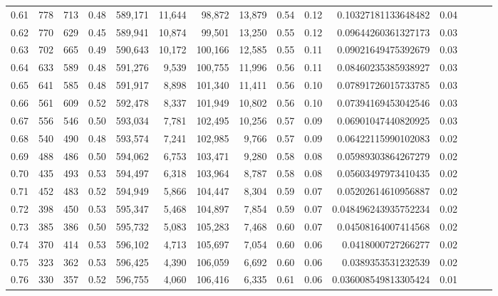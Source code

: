 \begin{tabular}{rrrrrrrrrrrrrrr}
0.61 &     778 &    713 &  0.48 &  589,171 &   11,644 &   98,872 &   13,879 &  0.54 &  0.12 &    0.10327181133648482 &      0.04 \\
0.62 &     770 &    629 &  0.45 &  589,941 &   10,874 &   99,501 &   13,250 &  0.55 &  0.12 &    0.09644260361327173 &      0.03 \\
0.63 &     702 &    665 &  0.49 &  590,643 &   10,172 &  100,166 &   12,585 &  0.55 &  0.11 &    0.09021649475392679 &      0.03 \\
0.64 &     633 &    589 &  0.48 &  591,276 &    9,539 &  100,755 &   11,996 &  0.56 &  0.11 &    0.08460235385938927 &      0.03 \\
0.65 &     641 &    585 &  0.48 &  591,917 &    8,898 &  101,340 &   11,411 &  0.56 &  0.10 &    0.07891726015733785 &      0.03 \\
0.66 &     561 &    609 &  0.52 &  592,478 &    8,337 &  101,949 &   10,802 &  0.56 &  0.10 &    0.07394169453042546 &      0.03 \\
0.67 &     556 &    546 &  0.50 &  593,034 &    7,781 &  102,495 &   10,256 &  0.57 &  0.09 &    0.06901047440820925 &      0.03 \\
0.68 &     540 &    490 &  0.48 &  593,574 &    7,241 &  102,985 &    9,766 &  0.57 &  0.09 &    0.06422115990102083 &      0.02 \\
0.69 &     488 &    486 &  0.50 &  594,062 &    6,753 &  103,471 &    9,280 &  0.58 &  0.08 &    0.05989303864267279 &      0.02 \\
0.70 &     435 &    493 &  0.53 &  594,497 &    6,318 &  103,964 &    8,787 &  0.58 &  0.08 &    0.05603497973410435 &      0.02 \\
0.71 &     452 &    483 &  0.52 &  594,949 &    5,866 &  104,447 &    8,304 &  0.59 &  0.07 &    0.05202614610956887 &      0.02 \\
0.72 &     398 &    450 &  0.53 &  595,347 &    5,468 &  104,897 &    7,854 &  0.59 &  0.07 &   0.048496243935752234 &      0.02 \\
0.73 &     385 &    386 &  0.50 &  595,732 &    5,083 &  105,283 &    7,468 &  0.60 &  0.07 &    0.04508164007414568 &      0.02 \\
0.74 &     370 &    414 &  0.53 &  596,102 &    4,713 &  105,697 &    7,054 &  0.60 &  0.06 &     0.0418000727266277 &      0.02 \\
0.75 &     323 &    362 &  0.53 &  596,425 &    4,390 &  106,059 &    6,692 &  0.60 &  0.06 &     0.0389353531232539 &      0.02 \\
0.76 &     330 &    357 &  0.52 &  596,755 &    4,060 &  106,416 &    6,335 &  0.61 &  0.06 &   0.036008549813305424 &      0.01 \\

\end{tabular}
